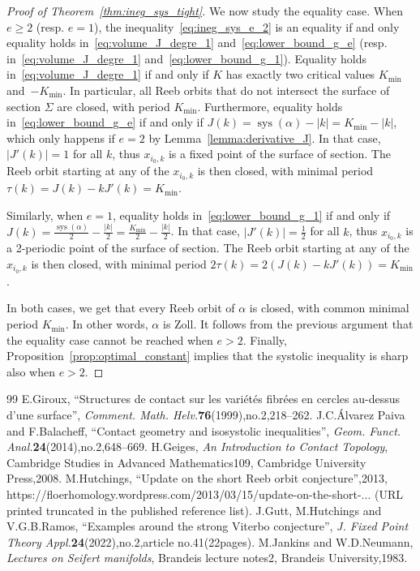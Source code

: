 \documentclass[10pt,a4paper]{amsart}
\DeclareMathOperator{\sys}{sys}
\theoremstyle{definition}\newtheorem{defi}[theo]{Definition}
\begin{document}
\begin{proof}[{Proof of Theorem~\ref{thm:ineg_sys_tight}}]
We now study the equality case. When $e \geq 2$ (resp. $e=1$), the inequality~\eqref{eq:ineg_sys_e_2} is an equality if and only equality holds in~\eqref{eq:volume_J_degre_1} and~\eqref{eq:lower_bound_g_e} (resp. in~\eqref{eq:volume_J_degre_1} and~\eqref{eq:lower_bound_g_1}). Equality holds in~\eqref{eq:volume_J_degre_1} if and only if $K$ has exactly two critical values $K_{\min}$ and~$-K_{\min}$. In particular, all Reeb orbits that do not intersect the surface of section $\Sigma$ are closed, with period $K_{\min}$. Furthermore, equality holds in~\eqref{eq:lower_bound_g_e} if and only if $J(k) = \sys(\alpha) - |k| = K_{\min} - |k|$, which only happens if $e=2$ by Lemma~\ref{lemma:derivative_J}. In that case, $|J'(k)| = 1$ for all $k$, thus $x_{i_0,k}$ is a fixed point of the surface of section. The Reeb orbit starting at any of the $x_{i_0,k}$ is then closed, with minimal period $\tau(k) = J(k) - k J'(k) = K_{\min}$.

Similarly, when $e=1$, equality holds in~\eqref{eq:lower_bound_g_1} if and only if $J(k) = \frac{\sys(\alpha)}{2} - \frac{|k|}{2} = \frac{K_{\min}}{2} - \frac{|k|}{2}$. In that case, $|J'(k)| = \frac{1}{2}$ for all $k$, thus $x_{i_0,k}$ is a 2-periodic point of the surface of section. The Reeb orbit starting at any of the $x_{i_0,k}$ is then closed, with minimal period $2\tau(k) = 2(J(k) - k J'(k)) = K_{\min}$.

In both cases, we get that every Reeb orbit of $\alpha$ is closed, with common minimal period $K_{\min}$. In other words, $\alpha$ is Zoll. It follows from the previous argument that the equality case cannot be reached when $e>2$. Finally, Proposition~\ref{prop:optimal_constant} implies that the systolic inequality is sharp also when $e > 2$.
\end{proof}

\begin{thebibliography}{99}
 E.Giroux, ``Structures de contact sur les variétés fibrées en cercles au-dessus d'une surface'', \emph{Comment. Math. Helv.}\textbf{76}(1999),no.2,218--262.
 J.C.Álvarez Paiva and F.Balacheff, ``Contact geometry and isosystolic inequalities'', \emph{Geom. Funct. Anal.}\textbf{24}(2014),no.2,648--669.
 H.Geiges, \emph{An Introduction to Contact Topology}, Cambridge Studies in Advanced Mathematics109, Cambridge University Press,2008.
 M.Hutchings, ``Update on the short Reeb orbit conjecture'',2013, https://floerhomology.wordpress.com/2013/03/15/update-on-the-short-... (URL printed truncated in the published reference list).
 J.Gutt, M.Hutchings and V.G.B.Ramos, ``Examples around the strong Viterbo conjecture'', \emph{J. Fixed Point Theory Appl.}\textbf{24}(2022),no.2,article no.41(22pages).
 M.Jankins and W.D.Neumann, \emph{Lectures on Seifert manifolds}, Brandeis lecture notes2, Brandeis University,1983.
\end{thebibliography}
\end{document}

